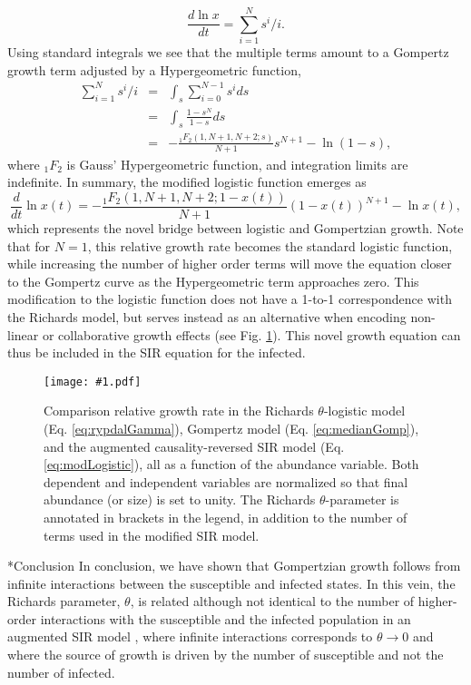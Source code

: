 \documentclass{article}
\newcommand{\insertPdfFig}[3]{
  \begin{figure}[H]
  \centering
  \texttt{[image: \#1.pdf]}
  \caption{#2}
  \label{fig:#1}
  \end{figure}
}
\begin{document}
\begin{equation}
\frac{d \ln{x}}{dt} = \sum_{i=1}^N s^i/i.
\end{equation}
Using standard integrals we see that the multiple terms amount to a Gompertz growth term adjusted by a Hypergeometric function,
\begin{eqnarray*}
  \sum_{i=1}^N s^i/i &=& \int_s \sum_{i=0}^{N-1} s^i ds\\
  &=&\int_s \frac{1-s^N}{1-s} ds\\
  &=&- \frac{{}_{1}F_{2}({1,N+1,N+2;s})}{N+1}s^{N+1} - \ln(1-s),
\end{eqnarray*}
where ${}_1F_{2}$ is Gauss' Hypergeometric function, and integration limits are indefinite. In summary, the modified logistic function emerges as
 \begin{equation}
 \label{eq:modLogistic}
\frac{d}{dt}\ln{x(t)} = - \frac{{}_{1}F_{2}({1,N+1,N+2;1-x(t)})}{N+1}(1-x(t))^{N+1} - \ln{x(t)},
 \end{equation}
 which represents the novel bridge between logistic and Gompertzian growth. Note that for $N=1$, this relative growth rate becomes the standard logistic function, while increasing the number of higher order terms will move the equation closer to the Gompertz curve as the Hypergeometric term approaches zero. This modification to the logistic function does not have a 1-to-1 correspondence with the Richards model, but serves instead as an alternative when encoding non-linear or collaborative growth effects (see Fig. \ref{fig:hypergeometric}). This novel growth equation can thus be included in the SIR equation for the infected.

\insertPdfFig{hypergeometric}{Comparison relative growth rate in the Richards $\theta$-logistic model (Eq. \ref{eq:rypdalGamma}), Gompertz model (Eq. \ref{eq:medianGomp}), and the augmented causality-reversed SIR model (Eq. \ref{eq:modLogistic}), all as a function of the abundance variable. Both dependent and independent variables are normalized so that final abundance (or size) is set to unity. The Richards $\theta$-parameter is annotated in brackets in the legend, in addition to the number of terms used in the modified SIR model.} 

\section*{Conclusion}
In conclusion, we have shown that Gompertzian growth follows from infinite interactions between the susceptible and infected states. In this vein, the Richards parameter, $\theta$, is related although not identical to the number of higher-order interactions with the susceptible and the infected population in an augmented SIR model \cite{richards1959flexible}, where infinite interactions corresponds to $\theta\rightarrow 0$ and where the source of growth is driven by the number of susceptible and not the number of infected.
\end{document}
